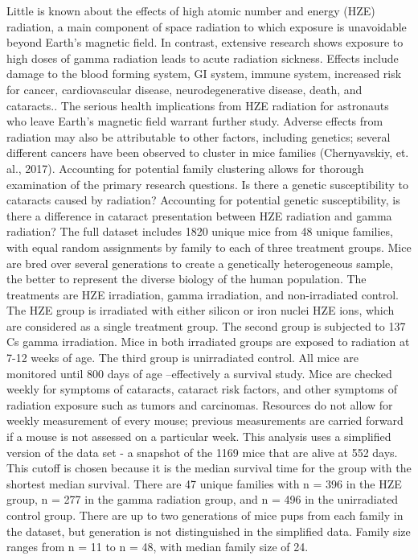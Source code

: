 \documentclass[12pt]{article}
\begin{document}
Little is known about the effects of high atomic number and energy (HZE)
radiation, a main component of space radiation to which exposure is
unavoidable beyond Earth's magnetic field. In contrast, extensive
research shows exposure to high doses of gamma radiation leads to acute
radiation sickness. Effects include damage to the blood forming system,
GI system, immune system, increased risk for cancer, cardiovascular
disease, neurodegenerative disease, death, and cataracts.. The serious
health implications from HZE radiation for astronauts who leave Earth's
magnetic field warrant further study. Adverse effects from radiation may
also be attributable to other factors, including genetics; several
different cancers have been observed to cluster in mice families
(Chernyavskiy, et. al., 2017). Accounting for potential family
clustering allows for thorough examination of the primary research
questions. Is there a genetic susceptibility to cataracts caused by
radiation? Accounting for potential genetic susceptibility, is there a
difference in cataract presentation between HZE radiation and gamma
radiation? The full dataset includes 1820 unique mice from 48 unique
families, with equal random assignments by family to each of three
treatment groups. Mice are bred over several generations to create a
genetically heterogeneous sample, the better to represent the diverse
biology of the human population. The treatments are HZE irradiation,
gamma irradiation, and non-irradiated control. The HZE group is
irradiated with either silicon or iron nuclei HZE ions, which are
considered as a single treatment group. The second group is subjected to
137 Cs gamma irradiation. Mice in both irradiated groups are exposed to
radiation at 7-12 weeks of age. The third group is unirradiated control.
All mice are monitored until 800 days of age --effectively a survival
study. Mice are checked weekly for symptoms of cataracts, cataract risk
factors, and other symptoms of radiation exposure such as tumors and
carcinomas. Resources do not allow for weekly measurement of every
mouse; previous measurements are carried forward if a mouse is not
assessed on a particular week. This analysis uses a simplified version
of the data set - a snapshot of the 1169 mice that are alive at 552
days. This cutoff is chosen because it is the median survival time for
the group with the shortest median survival. There are 47 unique
families with n = 396 in the HZE group, n = 277 in the gamma radiation
group, and n = 496 in the unirradiated control group. There are up to
two generations of mice pups from each family in the dataset, but
generation is not distinguished in the simplified data. Family size
ranges from n = 11 to n = 48, with median family size of 24.
\end{document}
